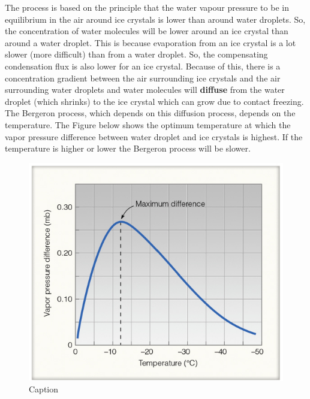 \documentclass[12pt,oneside]{book}
\begin{document}
The process is based on the principle that the water vapour pressure to
be in equilibrium in the air around ice crystals is lower than around
water droplets. So, the concentration of water molecules will be lower
around an ice crystal than around a water droplet. This is because
evaporation from an ice crystal is a lot slower (more difficult) than
from a water droplet. So, the compensating condensation flux is also
lower for an ice crystal. Because of this, there is a concentration
gradient between the air surrounding ice crystals and the air
surrounding water droplets and water molecules will \textbf{diffuse}
from the water droplet (which shrinks) to the ice crystal which can grow
due to contact freezing. The Bergeron process, which depends on this
diffusion process, depends on the temperature. The Figure below shows
the optimum temperature at which the vapor pressure difference between
water droplet and ice crystals is highest. If the temperature is higher
or lower the Bergeron process will be slower.

\begin{figure}

{\centering \includegraphics[width=0.9\linewidth]{figures/Figure330} 

}

\caption{Caption}\label{fig:Bergeron2}
\end{figure}
\end{document}
